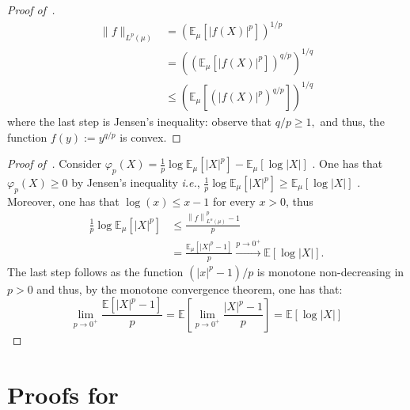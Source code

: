 \documentclass{article}
\numberwithin{theorem}{section}
\numberwithin{example}{section}
\numberwithin{remark}{section}
\numberwithin{definition}{section}
\newcommand{\E}{\mathbb{E}}
\begin{document}
\begin{proof}[Proof of~]
\begin{align}
    \| f \|_{L^p(\mu)} & = \left( \E_\mu [ |f(X)|^p ] \right)^{1/p} \\
    &= \left( \left( \E_\mu [ |f(X)|^p ] \right)^{q/p} \right)^{1/q} \\
    & \le \left(  \E_\mu \left[ \left(|f(X)|^p\right)^{q/p} \right]  \right)^{1/q}
\end{align}
where the last step is Jensen's inequality: observe that $q/p\ge 1,$ and thus, the function $f(y):=y^{q/p}$ is convex.
\end{proof}

\begin{proof}[Proof of~]
    Consider $\varphi_p(X)= \frac1p \log \E_\mu \left[  |X|^p \right] - \E_\mu \left[ \log |X| \right]$ . One has that $\varphi_p(X)\geq 0$ by Jensen's inequality  \textit{i.e.}, $ \frac1p \log \E_\mu \left[  |X|^p \right] \geq \E_\mu \left[ \log |X| \right]$ . Moreover, one has that $\log(x)\leq x-1 $ for every $x>0$, thus
    \begin{align}
        \frac1p \log \E_\mu \left[  |X|^p \right] &\leq \frac{\left\lVert f \right\rVert_{L^\alpha(\mu)}^p-1}{p} \\
        &= \frac{\mathbb{E}_\mu\left[|X|^p-1\right]}{p} \xrightarrow{p\to 0^+} \mathbb{E}[\log|X|].
    \end{align}
    The last step follows as the function $(|x|^p-1)/p$ is monotone non-decreasing in $p>0$ and thus, by the monotone convergence theorem, one has that:
    \begin{equation}
        \lim_{p\to 0^+} \frac{\mathbb{E}[|X|^p-1]}{p} = \mathbb{E}\left[\lim_{p\to 0^+}\frac{|X|^p-1}{p}\right]=\mathbb{E}[\log|X|]
    \end{equation}
\end{proof}


\section{Proofs for~}\label{app:proof:sec:propertiesknownresults}
\end{document}
